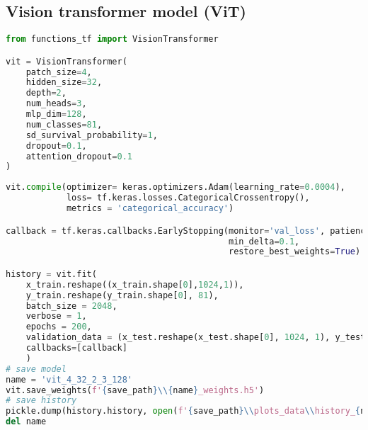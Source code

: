 \hypertarget{vision-transformer-model-vit}{%
\subsection*{Vision transformer model
(ViT)}\label{vision-transformer-model-vit}}

\begin{lstlisting}[language=Python]
from functions_tf import VisionTransformer

vit = VisionTransformer(
    patch_size=4,
    hidden_size=32,
    depth=2,
    num_heads=3,
    mlp_dim=128,
    num_classes=81,
    sd_survival_probability=1,
    dropout=0.1,
    attention_dropout=0.1
)
\end{lstlisting}

\begin{lstlisting}[language=Python]
vit.compile(optimizer= keras.optimizers.Adam(learning_rate=0.0004),
            loss= tf.keras.losses.CategoricalCrossentropy(),
            metrics = 'categorical_accuracy')

callback = tf.keras.callbacks.EarlyStopping(monitor='val_loss', patience=7,
                                            min_delta=0.1,
                                            restore_best_weights=True)

history = vit.fit(
    x_train.reshape((x_train.shape[0],1024,1)),
    y_train.reshape(y_train.shape[0], 81),
    batch_size = 2048,
    verbose = 1,
    epochs = 200,
    validation_data = (x_test.reshape(x_test.shape[0], 1024, 1), y_test.reshape(y_test.shape[0],n_elements)),
    callbacks=[callback]
    )
# save model
name = 'vit_4_32_2_3_128'
vit.save_weights(f'{save_path}\\{name}_weights.h5')
# save history
pickle.dump(history.history, open(f'{save_path}\\plots_data\\history_{name}.pkl', 'wb'))
del name
\end{lstlisting}